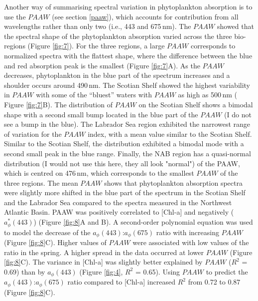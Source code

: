 \documentclass[utf8]{frontiersSCNS} %
\begin{document}
Another way of summarising spectral variation in phytoplankton absorption is to use the $PAAW$ (see section \ref{paaw}), which accounts for contribution from all wavelengths rather than only two (i.e., 443 and 675\,nm). The $PAAW$ showed that the spectral shape of the phytoplankton absorption varied across the three bio-regions (Figure \ref{fig:7}). For the three regions, a large $PAAW$ corresponds to normalized spectra with the flattest shape, where the difference between the blue and red absorption peak is the smallest (Figure \ref{fig:7}A). As the $PAAW$ decreases, phytoplankton in the blue part of the spectrum increases and a shoulder occurs around 490\,nm. The Scotian Shelf showed the highest variability in $PAAW$ with some of the “bluest” waters with $PAAW$ as high as 500\,nm ( Figure \ref{fig:7}B). The distribution of $PAAW$ on the Scotian Shelf shows a bimodal shape with a second small bump located in the blue part of the $PAAW$ (I do not see a bump in the blue). The Labrador Sea region exhibited the narrowest range of variation for the $PAAW$ index, with a mean value similar to the Scotian Shelf. Similar to the Scotian Shelf, the distribution exhibited a bimodal mode with a second small peak in the blue range. Finally, the NAB region has a quasi-normal distribution (I would not use this here, they all look "normal") of the PAAW, which is centred on 476\,nm, which corresponds to the smallest $PAAW$ of the three regions. The mean $PAAW$ shows that phytoplankton absorption spectra were slightly more shifted in the blue part of the spectrum in the Scotian Shelf and the Labrador Sea compared to the spectra measured in the Northwest Atlantic Basin.
PAAW was positively correlated to [Chl-a] and negatively ($a^*_\phi(443)$)  (Figure \ref{fig:8}A and B). A second-order polynomial equation was used to model the decrease of the $a_\phi(443)$:$a_\phi(675)$ ratio with increasing $PAAW$ (Figure \ref{fig:8}C). Higher values of $PAAW$ were associated with low values of the ratio in the spring. A higher spread in the data occurred at lower $PAAW$ (Figure \ref{fig:8}C). The variance in [Chl-a] was slightly better explained by $PAAW$ ($R^2$ = 0.69) than by $a_\phi(443)$ (Figure \ref{fig:4}, $R^2$ = 0.65). Using $PAAW$ to predict the$a_\phi(443)$:$a_\phi(675)$ ratio compared to [Chl-a] increased $R^2$ from 0.72 to 0.87 (Figure \ref{fig:8}C). 
\end{document}
